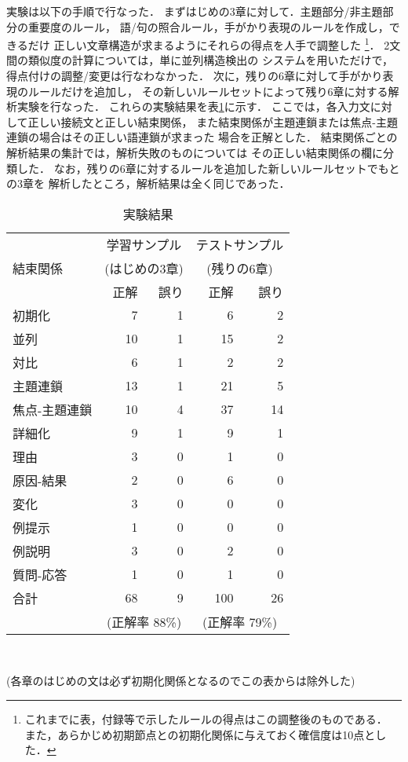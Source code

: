 実験は以下の手順で行なった．
まずはじめの3章に対して．主題部分/非主題部分の重要度のルール，
語/句の照合ルール，手がかり表現のルールを作成し，できるだけ
正しい文章構造が求まるようにそれらの得点を人手で調整した
\footnote{
これまでに表，付録等で示したルールの得点はこの調整後のものである．
また，あらかじめ初期節点との初期化関係に与えておく確信度は10点とした．
}．
2文間の類似度の計算については，単に並列構造検出の
システムを用いただけで，得点付けの調整/変更は行なわなかった．
次に，残りの6章に対して手がかり表現のルールだけを追加し，
その新しいルールセットによって残り6章に対する解析実験を行なった．
これらの実験結果を表\ref{tab:Experiment}に示す．
ここでは，各入力文に対して正しい接続文と正しい結束関係，
また結束関係が主題連鎖または焦点-主題連鎖の場合はその正しい語連鎖が求まった
場合を正解とした．
結束関係ごとの解析結果の集計では，解析失敗のものについては
その正しい結束関係の欄に分類した．
なお，残りの6章に対するルールを追加した新しいルールセットでもとの3章を
解析したところ，解析結果は全く同じであった．
\begin{table}
\caption{実験結果}
\begin{center}
\begin{tabular}{l|rr|rr} \hline \hline
         & \multicolumn{2}{c|}{学習サンプル}
         &  \multicolumn{2}{c}{テストサンプル} \\
結束関係 & \multicolumn{2}{c|}{(はじめの3章)}
         &  \multicolumn{2}{c}{(残りの6章)} \\ \cline{2-5}
         & 正解 & 誤り & 正解 & 誤り \\ \hline
初期化		&  7 &  1 &  6 &  2 \\ 
並列		& 10 &  1 & 15 &  2 \\ 
対比		&  6 &  1 &  2 &  2 \\ 
主題連鎖	& 13 &  1 & 21 &  5 \\ 
焦点-主題連鎖	& 10 &  4 & 37 & 14 \\ 
詳細化		&  9 &  1 &  9 &  1 \\ 
理由		&  3 &  0 &  1 &  0 \\ 
原因-結果	&  2 &  0 &  6 &  0 \\ 
変化		&  3 &  0 &  0 &  0 \\ 
例提示		&  1 &  0 &  0 &  0 \\ 
例説明		&  3 &  0 &  2 &  0 \\ 
質問-応答	&  1 &  0 &  1 &  0 \\ \hline
合計		& 68 &  9 & 100& 26 \\ 
     & \multicolumn{2}{c|}{(正解率 88\%)}
     & \multicolumn{2}{c}{(正解率 79\%)} \\ \hline
\end{tabular} \\

\vspace{5pt}

(各章のはじめの文は必ず初期化関係となるのでこの表からは除外した)
\end{center}
\label{tab:Experiment}
\end{table}

